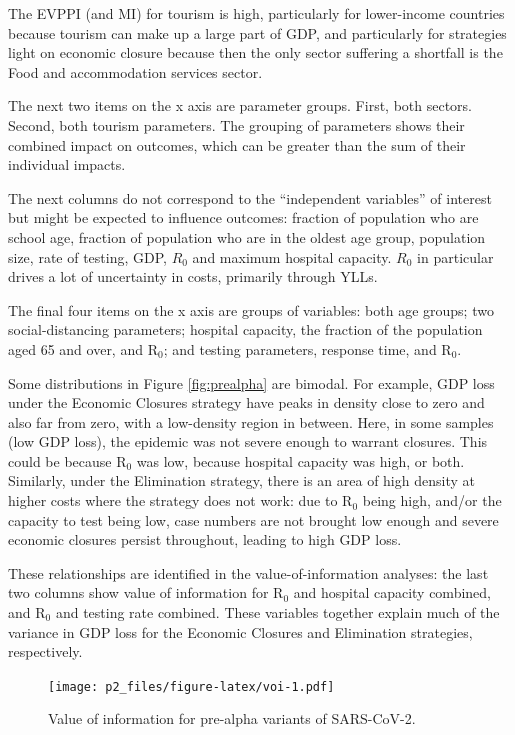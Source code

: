 \documentclass[
]{article}
\begin{document}
The EVPPI (and MI) for tourism is high, particularly for lower-income countries because tourism can make up a large part of GDP, and particularly for strategies light on economic closure because then the only sector suffering a shortfall is the Food and accommodation services sector.

The next two items on the x axis are parameter groups. First, both sectors. Second, both tourism parameters. The grouping of parameters shows their combined impact on outcomes, which can be greater than the sum of their individual impacts.

The next columns do not correspond to the ``independent variables'' of interest but might be expected to influence outcomes: fraction of population who are school age, fraction of population who are in the oldest age group, population size, rate of testing, GDP, \(R_0\) and maximum hospital capacity. \(R_0\) in particular drives a lot of uncertainty in costs, primarily through YLLs.

The final four items on the x axis are groups of variables: both age groups; two social-distancing parameters; hospital capacity, the fraction of the population aged 65 and over, and R\(_0\); and testing parameters, response time, and R\(_0\).

Some distributions in Figure \ref{fig:prealpha} are bimodal. For example, GDP loss under the Economic Closures strategy have peaks in density close to zero and also far from zero, with a low-density region in between. Here, in some samples (low GDP loss), the epidemic was not severe enough to warrant closures. This could be because R\(_0\) was low, because hospital capacity was high, or both. Similarly, under the Elimination strategy, there is an area of high density at higher costs where the strategy does not work: due to R\(_0\) being high, and/or the capacity to test being low, case numbers are not brought low enough and severe economic closures persist throughout, leading to high GDP loss.

These relationships are identified in the value-of-information analyses: the last two columns show value of information for R\(_0\) and hospital capacity combined, and R\(_0\) and testing rate combined. These variables together explain much of the variance in GDP loss for the Economic Closures and Elimination strategies, respectively.

\begin{figure}
\centering
\texttt{[image: p2\_files/figure-latex/voi-1.pdf]}
\caption{\label{fig:voi}Value of information for pre-alpha variants of SARS-CoV-2.}
\end{figure}
\end{document}
